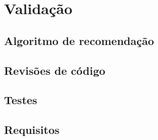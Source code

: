 \chapter{Validação}
\label{sec:validacao}


\section{Algoritmo de recomendação}
\label{sec:val_alg}
\section{Revisões de código}
\section{Testes}
\section{Requisitos}


\blankpage

\glsresetall
